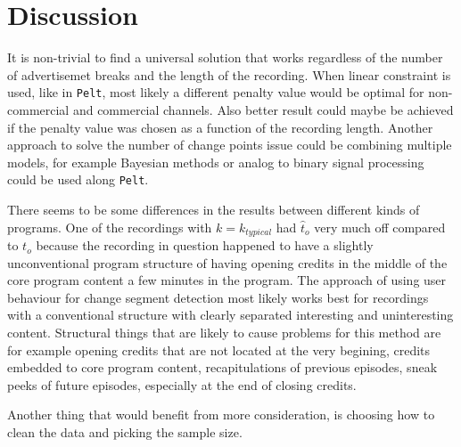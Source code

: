 \section{Discussion} \label{sec:discussion}

It is non-trivial to find a universal solution that works regardless of the number of advertisemet breaks and the length of the recording. When linear constraint is used, like in \texttt{Pelt}, most likely a different penalty value would be optimal for non-commercial and commercial channels. Also better result could maybe be achieved if the penalty value was chosen as a function of the recording length. Another approach to solve the number of change points issue could be combining multiple models, for example Bayesian methods or analog to binary signal processing could be used along \texttt{Pelt}.

There seems to be some differences in the results between different kinds of programs. One of the recordings with $k=k_{typical}$ had $\hat{t}_o$ very much off compared to $t_o$ because the recording in question happened to have a slightly
unconventional program structure of having opening credits in the middle of the core program content a few minutes in the program. The approach of using user behaviour for change segment detection most likely works best for recordings with a conventional structure with clearly separated interesting and uninteresting content. Structural things that are likely to cause problems for this method are for example opening credits that are not located at the very begining, credits embedded to core program content, recapitulations of previous episodes, sneak peeks of future episodes, especially at the end of closing credits.

Another thing that would benefit from more consideration, is choosing how to clean the data and picking the sample size.


